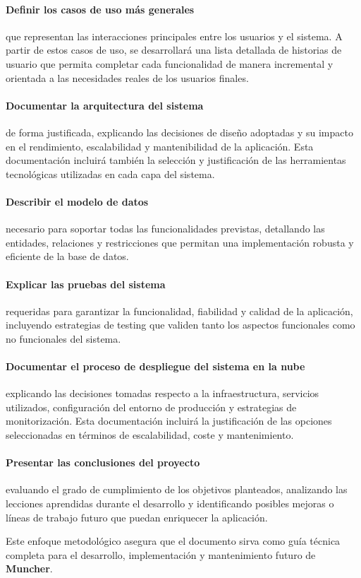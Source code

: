 \paragraph*{Definir los casos de uso más generales}
que representan las interacciones principales entre los usuarios y el sistema. A partir de estos casos de uso, se desarrollará una lista detallada de historias de usuario que permita completar cada funcionalidad de manera incremental y orientada a las necesidades reales de los usuarios finales.

\paragraph*{Documentar la arquitectura del sistema}
de forma justificada, explicando las decisiones de diseño adoptadas y su impacto en el rendimiento, escalabilidad y mantenibilidad de la aplicación. Esta documentación incluirá también la selección y justificación de las herramientas tecnológicas utilizadas en cada capa del sistema.

\paragraph*{Describir el modelo de datos}
necesario para soportar todas las funcionalidades previstas, detallando las entidades, relaciones y restricciones que permitan una implementación robusta y eficiente de la base de datos.

\paragraph*{Explicar las pruebas del sistema}
requeridas para garantizar la funcionalidad, fiabilidad y calidad de la aplicación, incluyendo estrategias de testing que validen tanto los aspectos funcionales como no funcionales del sistema.

\paragraph*{Documentar el proceso de despliegue del sistema en la nube}
explicando las decisiones tomadas respecto a la infraestructura, servicios utilizados, configuración del entorno de producción y estrategias de monitorización. Esta documentación incluirá la justificación de las opciones seleccionadas en términos de escalabilidad, coste y mantenimiento.

\paragraph*{Presentar las conclusiones del proyecto}
evaluando el grado de cumplimiento de los objetivos planteados, analizando las lecciones aprendidas durante el desarrollo y identificando posibles mejoras o líneas de trabajo futuro que puedan enriquecer la aplicación.

Este enfoque metodológico asegura que el documento sirva como guía técnica completa para el desarrollo, implementación y mantenimiento futuro de \textbf{Muncher}.